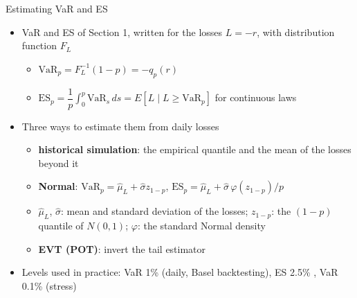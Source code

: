 \begin{frame}{Estimating VaR and ES}
\itemsize{\small}
\begin{itemize}
    \item VaR and ES of Section 1, written for the losses $L = -r$, with distribution function $F_L$
    \begin{itemize}
        \item $\mathrm{VaR}_p = F_L^{-1}(1 - p) = -q_p(r)$
        \item $\mathrm{ES}_p = \dfrac{1}{p}\displaystyle\int_0^p \mathrm{VaR}_s\,ds = E[L \mid L \ge \mathrm{VaR}_p]$ for continuous laws
    \end{itemize}
    \item Three ways to estimate them from daily losses
    \begin{itemize}
        \item \textbf{historical simulation}: the empirical quantile and the mean of the losses beyond it
        \item \textbf{Normal}: $\mathrm{VaR}_p = \hat\mu_L + \hat\sigma z_{1-p}$, $\mathrm{ES}_p = \hat\mu_L + \hat\sigma\,\varphi(z_{1-p})/p$
        \item $\hat\mu_L$, $\hat\sigma$: mean and standard deviation of the losses; $z_{1-p}$: the $(1-p)$ quantile of $N(0, 1)$; $\varphi$: the standard Normal density
        \item \textbf{EVT (POT)}: invert the tail estimator
    \end{itemize}
    \item Levels used in practice: VaR 1\% (daily, Basel backtesting), ES 2.5\% , VaR 0.1\% (stress)
\end{itemize}
\end{frame}

